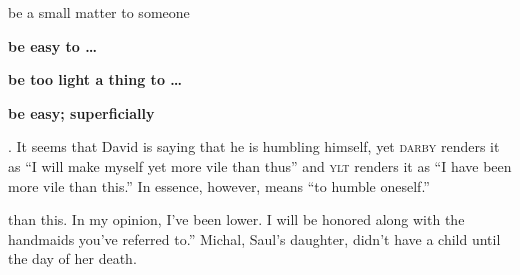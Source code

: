 \begin{inparaenum}
{\begin{inparaenum}
    \item be a small matter to someone
    \item \textbf{be easy to \dots}
    \item \textbf{be too light a thing to \dots}
    \item \textbf{be easy; superficially}
  \end{inparaenum}%
  . It seems that David is saying that he is humbling himself, yet \textsc{darby} renders it as ``I will make myself yet more vile than thus'' and \textsc{ylt} renders it as ``I have been more vile than this.'' In essence, however,  means ``to humble oneself.''} than this. In my opinion, I've been lower. I will be honored along with the handmaids you've referred to.''%
   Michal, Saul's daughter, didn't have a child until the day of her death.%
\end{inparaenum}
